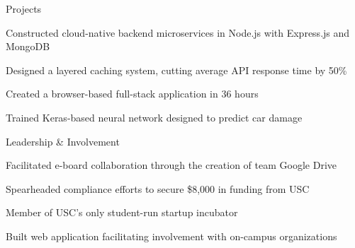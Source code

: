 \documentclass{resume} %
\begin{document}

\begin{rSection}{Projects}

\begin{rList}
\item Constructed cloud-native backend microservices in Node.js with Express.js
    and MongoDB
\item Designed a layered caching system, cutting average API response time by
    50\%
\end{rList}
\vspace{0.5em}


\begin{rList}
\item Created a browser-based full-stack application in 36 hours
\item Trained Keras-based neural network designed to predict car damage
\end{rList}

\end{rSection}


\begin{rSection}{Leadership \& Involvement}

\company{\uscih}{\la}
\begin{rList}
\item Facilitated e-board collaboration through the creation of team Google Drive
\item Spearheaded compliance efforts to secure \$8,000 in funding from USC
\end{rList}
\vspace{0.5em}


\company{\lavalab}{\la}
\begin{rList}
\item Member of USC's only student-run startup incubator
\item Built web application facilitating involvement with on-campus 
    organizations
\end{rList}

\end{rSection}

\end{document}
